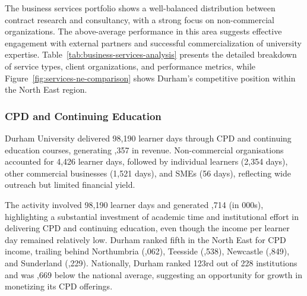 \documentclass[journal,onecolumn, 10pt,draftclsnofoot]{IEEEtran}
\begin{document}
The business services portfolio shows a well-balanced distribution between contract research and consultancy, with a strong focus on non-commercial organizations. The above-average performance in this area suggests effective engagement with external partners and successful commercialization of university expertise. Table~\ref{tab:business-services-analysis} presents the detailed breakdown of service types, client organizations, and performance metrics, while Figure~\ref{fig:services-ne-comparison} shows Durham's competitive position within the North East region.

\subsubsection{CPD and Continuing Education}

Durham University delivered 98,190 learner days through CPD and continuing education courses, generating ,357 in revenue. Non-commercial organisations accounted for 4,426 learner days, followed by individual learners (2,354 days), other commercial businesses (1,521 days), and SMEs (56 days), reflecting wide outreach but limited financial yield.

The activity involved 98,190 learner days and generated ,714 (in \textsterling 000s), highlighting a substantial investment of academic time and institutional effort in delivering CPD and continuing education, even though the income per learner day remained relatively low. Durham ranked fifth in the North East for CPD income, trailing behind Northumbria (,062), Teesside (,538), Newcastle (,849), and Sunderland (,229). Nationally, Durham ranked 123rd out of 228 institutions and was ,669 below the national average, suggesting an opportunity for growth in monetizing its CPD offerings.
\end{document}
